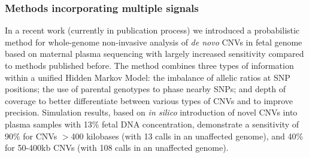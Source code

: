 \subsubsection{Methods incorporating multiple signals}
In a recent work \citep{rampasek2014fcnv} (currently in publication process) we introduced a probabilistic method for whole-genome non-invasive analysis of \textit{de novo} CNVs in fetal genome based on maternal plasma sequencing with largely increased sensitivity compared to methods published before. The method combines three types of information within a unified Hidden Markov Model: the imbalance of allelic ratios at SNP positions; the use of parental genotypes to phase nearby SNPs; and depth of coverage to better differentiate between various types of CNVs and to improve precision. Simulation results, based on \emph{in silico} introduction of novel CNVs into plasma samples with 13\% fetal DNA concentration, demonstrate a sensitivity of 90\% for CNVs $>$400 kilobases (with 13 calls in an unaffected genome), and 40\% for 50-400kb CNVs (with 108 calls in an unaffected genome).
